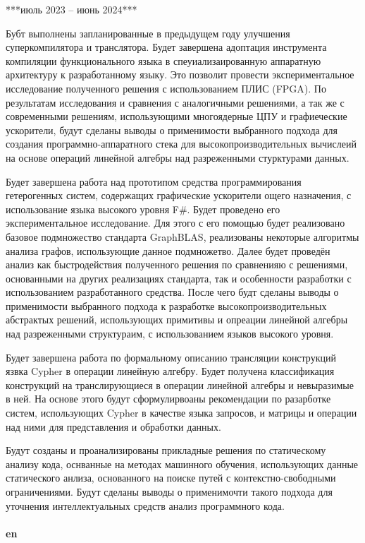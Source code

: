 \documentclass[12pt]{article}  %
\theoremstyle{remark}
\begin{document}
***июль 2023 -- июнь 2024***

Бубт выполнены запланированные в предыдущем году улучшения суперкомпилятора и транслятора.
Будет завершена адоптация инструмента компиляции функционального языка в спеуиализаированную аппаратную архитектуру к разработанному языку. Это позволит провести экспериментальное исследование полученного решения с использованием ПЛИС (FPGA). По результатам исследования и сравнения с аналогичными решениями, а так же с современными решениям, использующими многоядерные ЦПУ и графиеческие ускорители, будут сделаны выводы о применимости выбранного подхода для создания программно-аппаратного стека для высокопроизводительных вычислеий на основе операций линейной алгебры над разреженными стурктурами данных.

Будет завершена работа над прототипом средства программирования гетерогенных систем, содержащих графические ускорители ощего назначения, с использование языка высокого уровня F\#. Будет проведено его экспериментальное исследование. Для этого с его помощью будет реализовано базовое подмножество стандарта GraphBLAS, реализованы некоторые алгоритмы анализа графов, использующие данное подмножетво. Далее будет проведён анализ как быстродействия полученного решения по сравненияю с решениями, основанными на других реализациях стандарта, так и особенности разработки с использованием разработанного средства. После чего будт сделаны выводы о применимости выбранного подхода к разработке высокопроизводительных абстрактых решений, использующих примитивы и опреации линейной алгебры над разреженными структураим, с использованием языков высокого уровня.

Будет завершена работа по формальному описанию трансляции конструкций язвка Cypher в операции линейную алгебру. Будет получена классификация конструкций на транслирующиеся в операции линейной алгебры и невыразимые в ней. На основе этого будут сформулирвоаны рекомендации по разарботке систем, использующих Cypher в качестве языка запросов, и матрицы и операции над ними для представления и обработки данных.

Будут созданы и проанализированы прикладные решения по статическому анализу кода, оснванные на методах машинного обучения, использующих данные статического анлиза, основанного на поиске путей с контекстно-свободными ограничениями. Будут сделаны выводы о применимочти такого подхода для уточнения интеллектуальных средств анализ программного кода.
\\
\\
\textbf{en}\\
\end{document}
